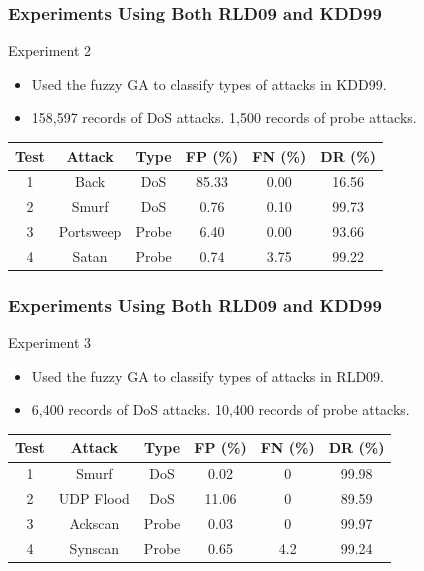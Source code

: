 \documentclass{beamer}
\begin{document}
\begin{frame}
	\frametitle{Experiments Using Both RLD09 and KDD99}
Experiment 2
	\begin{itemize}
		\item Used the fuzzy GA to classify types of attacks in KDD99.
		\item 158,597 records of DoS attacks. 1,500 records of probe attacks.
	\end{itemize}
\begin{table}
\begin{tabular}{cccccc}
Test & Attack & Type & FP (\%) & FN (\%) & DR (\%)\\ \hline
1 & Back & DoS & 85.33 & 0.00 & 16.56\\
2 & Smurf & DoS & 0.76 & 0.10 & 99.73\\
3 & Portsweep & Probe & 6.40 & 0.00 & 93.66\\
4 & Satan & Probe & 0.74 & 3.75 & 99.22\\
\end{tabular}
\end{table}

\end{frame}


\begin{frame}
	\frametitle{Experiments Using Both RLD09 and KDD99}
Experiment 3
	\begin{itemize}
		\item Used the fuzzy GA to classify types of attacks in RLD09.
		\item 6,400 records of DoS attacks. 10,400 records of probe attacks.
	\end{itemize}
\begin{table}
\begin{tabular}{cccccc}
Test & Attack & Type & FP (\%) & FN (\%) & DR (\%)\\ \hline
1 & Smurf & DoS & 0.02 & 0 & 99.98\\
2 & UDP Flood & DoS & 11.06 & 0 & 89.59\\
3 & Ackscan & Probe & 0.03 & 0 & 99.97\\
4 & Synscan & Probe & 0.65 & 4.2 & 99.24\\
\end{tabular}
\end{table}

\end{frame}
\end{document}
